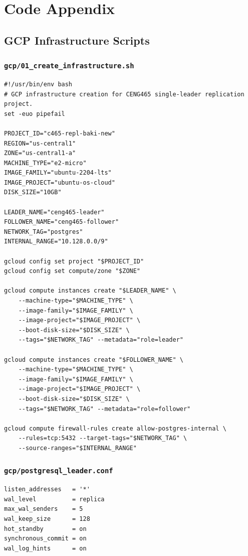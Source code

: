 \documentclass[12pt,a4paper]{article}
\begin{document}
\appendix
\section{Code Appendix}

\subsection{GCP Infrastructure Scripts}
\label{app:gcp}

\subsubsection{\texttt{gcp/01\_create\_infrastructure.sh}}
\begin{lstlisting}[style=bashstyle]
#!/usr/bin/env bash
# GCP infrastructure creation for CENG465 single-leader replication project.
set -euo pipefail

PROJECT_ID="c465-repl-baki-new"
REGION="us-central1"
ZONE="us-central1-a"
MACHINE_TYPE="e2-micro"
IMAGE_FAMILY="ubuntu-2204-lts"
IMAGE_PROJECT="ubuntu-os-cloud"
DISK_SIZE="10GB"

LEADER_NAME="ceng465-leader"
FOLLOWER_NAME="ceng465-follower"
NETWORK_TAG="postgres"
INTERNAL_RANGE="10.128.0.0/9"

gcloud config set project "$PROJECT_ID"
gcloud config set compute/zone "$ZONE"

gcloud compute instances create "$LEADER_NAME" \
    --machine-type="$MACHINE_TYPE" \
    --image-family="$IMAGE_FAMILY" \
    --image-project="$IMAGE_PROJECT" \
    --boot-disk-size="$DISK_SIZE" \
    --tags="$NETWORK_TAG" --metadata="role=leader"

gcloud compute instances create "$FOLLOWER_NAME" \
    --machine-type="$MACHINE_TYPE" \
    --image-family="$IMAGE_FAMILY" \
    --image-project="$IMAGE_PROJECT" \
    --boot-disk-size="$DISK_SIZE" \
    --tags="$NETWORK_TAG" --metadata="role=follower"

gcloud compute firewall-rules create allow-postgres-internal \
    --rules=tcp:5432 --target-tags="$NETWORK_TAG" \
    --source-ranges="$INTERNAL_RANGE"
\end{lstlisting}

\subsubsection{\texttt{gcp/postgresql\_leader.conf}}
\begin{lstlisting}[style=bashstyle]
listen_addresses   = '*'
wal_level          = replica
max_wal_senders    = 5
wal_keep_size      = 128
hot_standby        = on
synchronous_commit = on
wal_log_hints      = on
\end{lstlisting}
\end{document}

